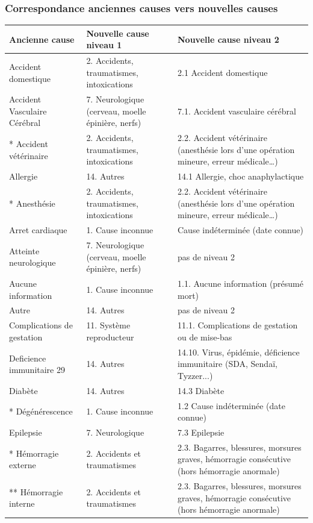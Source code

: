 \documentclass[a4paper,10pt]{article}
\begin{document}
\subsubsection{Correspondance anciennes causes vers nouvelles causes}
\small
\noindent\begin{tabular}{|l|p{6cm}|p{5.75cm}|}\hline
\textbf{Ancienne cause} & \textbf{Nouvelle cause niveau 1} & \textbf{Nouvelle cause niveau 2}\\\hline
Accident domestique & 2. Accidents, traumatismes, intoxications & 2.1 Accident domestique \\\hline
Accident Vasculaire Cérébral & 7. Neurologique (cerveau, moelle épinière, nerfs) & 7.1. Accident vasculaire cérébral\\\hline
* Accident vétérinaire & 2. Accidents, traumatismes, intoxications & 2.2. Accident vétérinaire (anesthésie lors d’une opération mineure, erreur médicale…)\\\hline
Allergie & 14. Autres & 14.1 Allergie, choc anaphylactique\\\hline
* Anesthésie & 2. Accidents, traumatismes, intoxications & 2.2. Accident vétérinaire (anesthésie lors d’une opération mineure, erreur médicale…)\\\hline
Arret cardiaque & 1. Cause inconnue & Cause indéterminée (date connue)\\\hline
Atteinte neurologique & 7. Neurologique (cerveau, moelle épinière, nerfs) & pas de niveau 2\\\hline
Aucune information & 1. Cause inconnue & 1.1. Aucune information (présumé mort)\\\hline
Autre & 14. Autres & pas de niveau 2\\\hline
Complications de gestation & 11. Système reproducteur & 11.1. Complications de gestation ou de mise-bas\\\hline
Deficience immunitaire 29 & 14. Autres & 14.10. Virus, épidémie, déficience immunitaire (SDA, Sendaï, Tyzzer...)\\\hline
Diabète & 14. Autres & 14.3 Diabète\\\hline
* Dégénérescence & 1. Cause inconnue & 1.2 Cause indéterminée (date connue)\\\hline
Epilepsie & 7. Neurologique & 7.3 Epilepsie\\\hline
* Hémorragie externe & 2. Accidents et traumatismes & 2.3. Bagarres, blessures, morsures graves, hémorragie consécutive (hors hémorragie anormale)\\\hline
** Hémorragie interne & 2. Accidents et traumatismes & 2.3. Bagarres, blessures, morsures graves, hémorragie consécutive (hors hémorragie anormale)\\\hline

\end{tabular}
\end{document}
